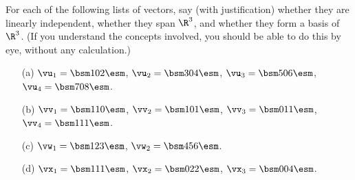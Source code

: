 \begin{exercise}\label{ex-check-dependence}
 For each of the following lists of vectors, say (with justification) whether
 they are linearly independent, whether they span $\R^3$,
 and whether they form a basis of $\R^3$.  (If you
 understand the concepts involved, you should be able to do
 this by eye, without any calculation.)
 \begin{itemize}
  \item[(a)] $\vu_1=\bsm 1\\0\\2\esm$, 
             $\vu_2=\bsm 3\\0\\4\esm$,
             $\vu_3=\bsm 5\\0\\6\esm$,
             $\vu_4=\bsm 7\\0\\8\esm$.
  \item[(b)] $\vv_1=\bsm 1\\1\\0\esm$,
             $\vv_2=\bsm 1\\0\\1\esm$,
             $\vv_3=\bsm 0\\1\\1\esm$,
             $\vv_4=\bsm 1\\1\\1\esm$.
  \item[(c)] $\vw_1=\bsm 1\\2\\3\esm$,
             $\vw_2=\bsm 4\\5\\6\esm$.
  \item[(d)] $\vx_1=\bsm 1\\1\\1\esm$,
             $\vx_2=\bsm 0\\2\\2\esm$,
             $\vx_3=\bsm 0\\0\\4\esm$.
 \end{itemize}
\end{exercise}
